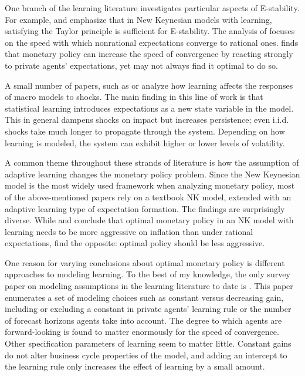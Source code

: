 \documentclass[11pt]{article}
\renewcommand{\[}{\begin{equation}}
\renewcommand{\]}{\end{equation}}
\begin{document}
One branch of the learning literature investigates particular aspects of E-stability. For example, \cite{bullard2002learning} and \cite{preston2005} emphasize that in New Keynesian models with learning, satisfying the Taylor principle is sufficient for E-stability. The analysis of \cite{ferrero2007monetary} focuses on the speed with which nonrational expectations converge to rational ones. \cite{ferrero2007monetary} finds that monetary policy can increase the speed of convergence by reacting strongly to private agents' expectations, yet may not always find it optimal to do so. 

A small number of papers, such as \cite{eusepi2011expectations} or \cite{williams2003adaptive} analyze how learning affects the responses of macro models to shocks. The main finding in this line of work is that statistical learning introduces expectations as a new state variable in the model. This in general dampens shocks on impact but increases persistence; even i.i.d. shocks take much longer to propagate through the system. Depending on how learning is modeled, the system can exhibit higher or lower levels of volatility.

A common theme throughout these strands of literature is how the assumption of adaptive learning changes the monetary policy problem. Since the New Keynesian model is the most widely used framework when analyzing monetary policy, most of the above-mentioned papers rely on a textbook NK model, extended with an adaptive learning type of expectation formation. The findings are surprisingly diverse. While \cite{eusepi2018science} and \cite{molnar2014optimal} conclude that optimal monetary policy in an NK model with learning needs to be more aggressive on inflation than under rational expectations, \cite{eusepi2018limits} find the opposite: optimal policy should be less aggressive. 

One reason for varying conclusions about optimal monetary policy is different approaches to modeling learning. To the best of my knowledge, the only survey paper on modeling assumptions in the learning literature to date is \cite{graham2011individual}. This paper enumerates a set of modeling choices such as constant versus decreasing gain, including or excluding a constant in private agents' learning rule or the number of forecast horizons agents take into account. The degree to which agents are forward-looking is found to matter enormously for the speed of convergence. Other specification parameters of learning seem to matter little. Constant gains do not alter business cycle properties of the model, and adding an intercept to the learning rule only increases the effect of learning by a small amount. 
\end{document}
